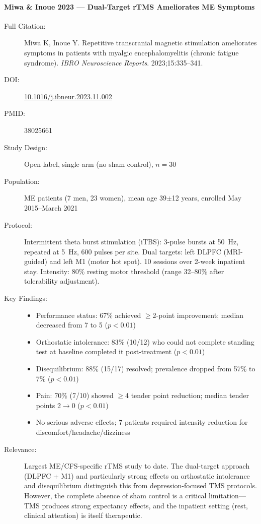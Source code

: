 \paragraph{Miwa \& Inoue 2023 --- Dual-Target rTMS Ameliorates ME Symptoms}

\begin{description}
    \item[Full Citation:] Miwa K, Inoue Y\@. Repetitive transcranial magnetic stimulation ameliorates symptoms in patients with myalgic encephalomyelitis (chronic fatigue syndrome). \textit{IBRO Neuroscience Reports}. 2023;15:335--341.
    \item[DOI:] \href{https://doi.org/10.1016/j.ibneur.2023.11.002}{10.1016/j.ibneur.2023.11.002}
    \item[PMID:] 38025661
    \item[Study Design:] Open-label, single-arm (no sham control), $n=30$
    \item[Population:] ME patients (7 men, 23 women), mean age 39$\pm$12 years, enrolled May 2015--March 2021
    \item[Protocol:] Intermittent theta burst stimulation (iTBS): 3-pulse bursts at 50~Hz, repeated at 5~Hz, 600 pulses per site. Dual targets: left DLPFC (MRI-guided) and left M1 (motor hot spot). 10 sessions over 2-week inpatient stay. Intensity: 80\% resting motor threshold (range 32--80\% after tolerability adjustment).
    \item[Key Findings:]
    \begin{itemize}
        \item Performance status: 67\% achieved $\geq$2-point improvement; median decreased from 7 to 5 ($p<0.01$)
        \item Orthostatic intolerance: 83\% (10/12) who could not complete standing test at baseline completed it post-treatment ($p<0.01$)
        \item Disequilibrium: 88\% (15/17) resolved; prevalence dropped from 57\% to 7\% ($p<0.01$)
        \item Pain: 70\% (7/10) showed $\geq$4 tender point reduction; median tender points 2$\to$0 ($p<0.01$)
        \item No serious adverse effects; 7 patients required intensity reduction for discomfort/headache/dizziness
    \end{itemize}
    \item[Relevance:] Largest ME/CFS-specific rTMS study to date. The dual-target approach (DLPFC + M1) and particularly strong effects on orthostatic intolerance and disequilibrium distinguish this from depression-focused TMS protocols. However, the complete absence of sham control is a critical limitation---TMS produces strong expectancy effects, and the inpatient setting (rest, clinical attention) is itself therapeutic.
\end{description}


